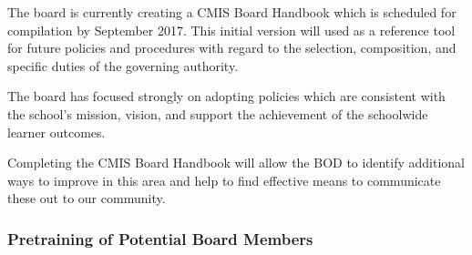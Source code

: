 \begin{findings}
The board is currently creating a CMIS Board Handbook which is scheduled for compilation by September 2017. This initial version will used as a reference tool for future policies and procedures with regard to the selection, composition, and specific duties of the governing authority. 


The board has focused strongly on adopting policies which are consistent with the school’s mission, vision, and support the achievement of the schoolwide learner outcomes.

Completing the CMIS Board Handbook will allow the BOD to identify additional ways to improve in this area and help to find effective means to communicate these out to our community.
\end{findings}

\subsubsection{Pretraining of Potential Board Members}



